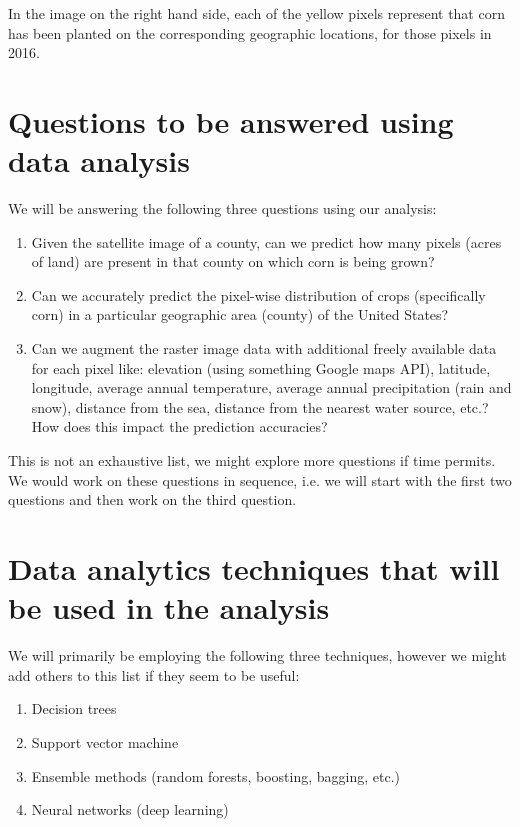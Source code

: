 \documentclass[10pt,letterpaper]{article}
\begin{document}
\noindent
In the image on the right hand side, each of the yellow pixels represent that corn has been planted on the corresponding geographic locations, for those pixels in 2016. 

\section{Questions to be answered using data analysis}


We will be answering the following three questions using our analysis:

\begin{enumerate}
	\item Given the satellite image of a county, can we predict how many pixels (acres of land) are present in that county on which corn is being grown?
	\item Can we accurately predict the pixel-wise distribution of crops (specifically corn) in a particular geographic area (county) of the United States?
	\item Can we augment the raster image data with additional freely available data for each pixel like: elevation (using something Google maps API), latitude, longitude, average annual temperature, average annual precipitation (rain and snow), distance from the sea, distance from the nearest water source, etc.? How does this impact the prediction accuracies?
\end{enumerate}

\noindent
This is not an exhaustive list, we might explore more questions if time permits. We would work on these questions in sequence, i.e. we will start with the first two questions and then work on the third question. 

\section{Data analytics techniques that will be used in the analysis}

We will primarily be employing the following three techniques, however we might add others to this list if they seem to be useful:

\begin{enumerate}
	\item Decision trees
	\item Support vector machine
	\item Ensemble methods (random forests, boosting, bagging, etc.)
	\item Neural networks (deep learning)
\end{enumerate}
\end{document}
